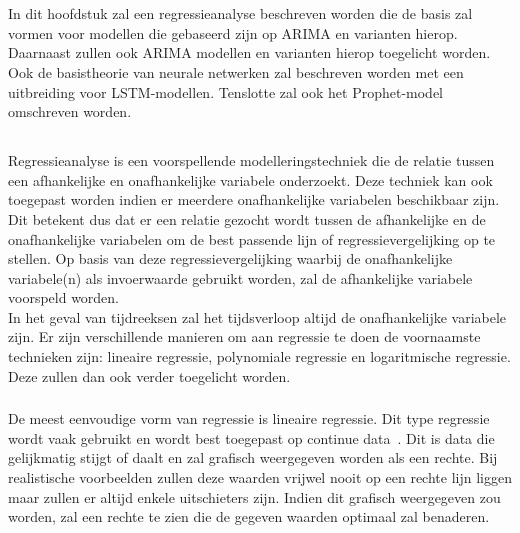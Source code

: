 \chapter{}
\label{ch:stand-van-zaken}

In dit hoofdstuk zal een regressieanalyse beschreven worden die de basis zal vormen voor modellen die gebaseerd zijn op ARIMA en varianten hierop. Daarnaast zullen ook ARIMA modellen en varianten hierop toegelicht worden. Ook de basistheorie van neurale netwerken zal beschreven worden met een uitbreiding voor LSTM-modellen. Tenslotte zal ook het Prophet-model omschreven worden.

\section{}
\label{subsec: Theoretische toelichting over polynomiale regressie}

Regressieanalyse is een voorspellende modelleringstechniek die de relatie tussen een afhankelijke en onafhankelijke variabele onderzoekt. Deze techniek kan ook toegepast worden indien er meerdere onafhankelijke variabelen beschikbaar zijn.
Dit betekent dus dat er een relatie gezocht wordt tussen de afhankelijke en de onafhankelijke variabelen om de best passende lijn of regressievergelijking op te stellen. Op basis van deze regressievergelijking waarbij de onafhankelijke variabele(n) als invoerwaarde gebruikt worden, zal de afhankelijke variabele voorspeld worden.
\\ In het geval van tijdreeksen zal het tijdsverloop altijd de onafhankelijke variabele zijn.
Er zijn verschillende manieren om aan regressie te doen de voornaamste technieken zijn: lineaire regressie, polynomiale regressie en logaritmische regressie. Deze zullen dan ook verder toegelicht worden.

\subsection{}
De meest eenvoudige vorm van regressie is lineaire regressie. Dit type regressie wordt vaak gebruikt en wordt best toegepast op continue data~\autocite{Pant2019}. Dit is data die gelijkmatig stijgt of daalt en zal grafisch weergegeven worden als een rechte. Bij realistische voorbeelden zullen deze waarden vrijwel nooit op een rechte lijn liggen maar zullen er altijd enkele uitschieters zijn. Indien dit grafisch weergegeven zou worden, zal een rechte te zien die de gegeven waarden optimaal zal benaderen.

